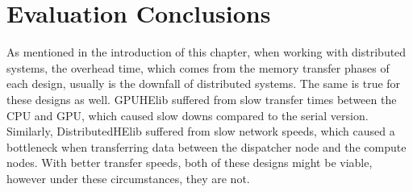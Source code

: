 \section{Evaluation Conclusions} \label{sec:EvaluationConclusions}
As mentioned in the introduction of this chapter, when working with distributed systems, the overhead time, which comes from the memory transfer phases of each design, usually is the downfall of distributed systems. The same is true for these designs as well. GPUHElib suffered from slow transfer times between the CPU and GPU, which caused slow downs compared to the serial version. Similarly, DistributedHElib suffered from slow network speeds, which caused a bottleneck when transferring data between the dispatcher node and the compute nodes. With better transfer speeds, both of these designs might be viable, however under these circumstances, they are not.